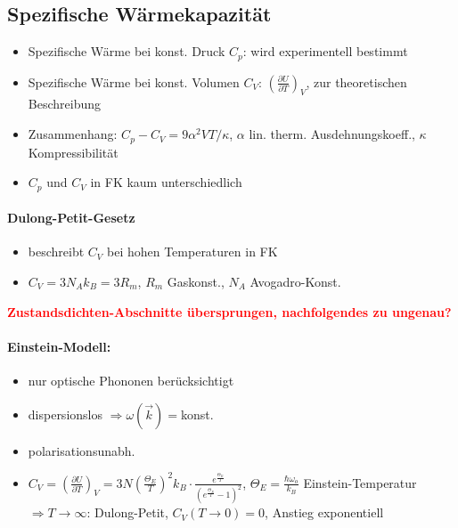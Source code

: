 \documentclass[a4paper,12pt]{article}
\begin{document}
\subsection{Spezifische Wärmekapazität}
\begin{itemize}
	\item Spezifische Wärme bei konst. Druck $ C_p $: wird experimentell bestimmt
	\item Spezifische Wärme bei konst. Volumen $ C_V $: $ \left(\frac{\partial U}{\partial T}\right)_V $, zur theoretischen Beschreibung
	\item Zusammenhang: $ C_p - C_V = 9\alpha^2 VT/\kappa $, $ \alpha $ lin. therm.  Ausdehnungskoeff., $ \kappa $ Kompressibilität
	\item $ C_p $ und $ C_V $ in FK kaum unterschiedlich
\end{itemize}
\paragraph*{Dulong-Petit-Gesetz}
\begin{itemize}
	\item beschreibt $ C_V $ bei hohen Temperaturen in FK
	\item $ C_V = 3 N_A k_B = 3 R_m $, $ R_m $ Gaskonst., $ N_A $ Avogadro-Konst.
\end{itemize}
\textcolor{red}{\bf{} Zustandsdichten-Abschnitte übersprungen, nachfolgendes zu ungenau?}
\paragraph*{Einstein-Modell:}
\begin{itemize}
	\item nur optische Phononen berücksichtigt
	\item dispersionslos $ \Rightarrow \omega(\vec k) =  $konst.
	\item polarisationsunabh.
	\item $ C_V= \left(\frac{\partial U}{\partial T}\right)_V = 3N\left(\frac{\Theta_E}{T}\right)^2k_B \cdot \frac{e^{\frac{\Theta_E}{T}}}{\left(e^{\frac{\Theta_E}{T}}-1\right)^2} $, $ \Theta_E = \frac{\hbar \omega_o}{k_B}$ Einstein-Temperatur\\
	$ \Rightarrow T\rightarrow\infty$: Dulong-Petit, $ C_V(T\rightarrow 0) = 0 $, Anstieg exponentiell 
\end{itemize}
\end{document}
